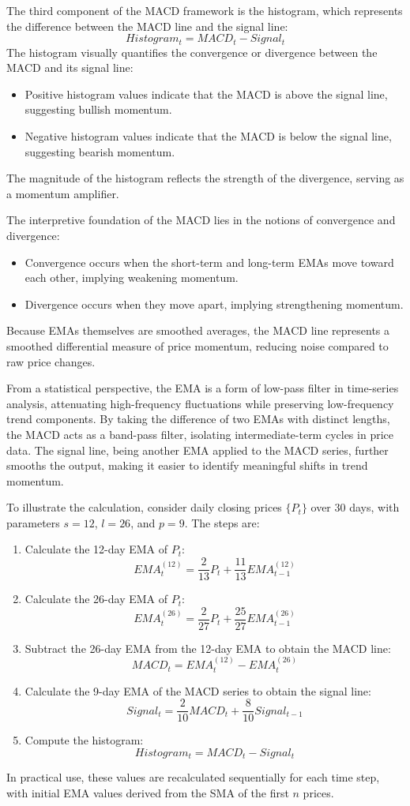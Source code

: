 The third component of the MACD framework is the histogram, which represents the difference between the MACD line and the signal line:
\[
Histogram_t = MACD_t - Signal_t
\]
The histogram visually quantifies the convergence or divergence between the MACD and its signal line:
\begin{itemize}
    \item Positive histogram values indicate that the MACD is above the signal line, suggesting bullish momentum.
    \item Negative histogram values indicate that the MACD is below the signal line, suggesting bearish momentum.
\end{itemize}
The magnitude of the histogram reflects the strength of the divergence, serving as a momentum amplifier.

The interpretive foundation of the MACD lies in the notions of convergence and divergence:
\begin{itemize}
    \item Convergence occurs when the short-term and long-term EMAs move toward each other, implying weakening momentum.
    \item Divergence occurs when they move apart, implying strengthening momentum.
\end{itemize}
Because EMAs themselves are smoothed averages, the MACD line represents a smoothed differential measure of price momentum, reducing noise compared to raw price changes.

From a statistical perspective, the EMA is a form of low-pass filter in time-series analysis, attenuating high-frequency fluctuations while preserving low-frequency trend components. By taking the difference of two EMAs with distinct lengths, the MACD acts as a band-pass filter, isolating intermediate-term cycles in price data. The signal line, being another EMA applied to the MACD series, further smooths the output, making it easier to identify meaningful shifts in trend momentum.

To illustrate the calculation, consider daily closing prices $\{P_t\}$ over 30 days, with parameters $s=12$, $l=26$, and $p=9$. The steps are:
\begin{enumerate}
    \item Calculate the 12-day EMA of $P_t$:
    \[
    EMA_t^{(12)} = \frac{2}{13} P_t + \frac{11}{13} EMA_{t-1}^{(12)}
    \]
    \item Calculate the 26-day EMA of $P_t$:
    \[
    EMA_t^{(26)} = \frac{2}{27} P_t + \frac{25}{27} EMA_{t-1}^{(26)}
    \]
    \item Subtract the 26-day EMA from the 12-day EMA to obtain the MACD line:
    \[
    MACD_t = EMA_t^{(12)} - EMA_t^{(26)}
    \]
    \item Calculate the 9-day EMA of the MACD series to obtain the signal line:
    \[
    Signal_t = \frac{2}{10} MACD_t + \frac{8}{10} Signal_{t-1}
    \]
    \item Compute the histogram:
    \[
    Histogram_t = MACD_t - Signal_t
    \]
\end{enumerate}
In practical use, these values are recalculated sequentially for each time step, with initial EMA values derived from the SMA of the first $n$ prices.

